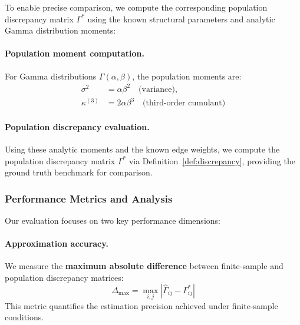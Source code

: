 \documentclass[11pt,a4paper]{article}
\numberwithin{equation}{section}
\begin{document}
To enable precise comparison, we compute the corresponding population discrepancy matrix $\Gamma^*$ using the known structural parameters and analytic Gamma distribution moments:

\paragraph{Population moment computation.} For Gamma distributions $\Gamma(\alpha, \beta)$, the population moments are:
\begin{align}
\sigma^2 &= \alpha \beta^2 \quad \text{(variance)}, \\
\kappa^{(3)} &= 2\alpha \beta^3 \quad \text{(third-order cumulant)}
\end{align}

\paragraph{Population discrepancy evaluation.} Using these analytic moments and the known edge weights, we compute the population discrepancy matrix $\Gamma^*$ via Definition~\ref{def:discrepancy}, providing the ground truth benchmark for comparison.

\subsubsection{Performance Metrics and Analysis}

Our evaluation focuses on two key performance dimensions:

\paragraph{Approximation accuracy.} We measure the \textbf{maximum absolute difference} between finite-sample and population discrepancy matrices:
\begin{equation}
\Delta_{\max} = \max_{i,j} |\hat{\Gamma}_{ij} - \Gamma^*_{ij}|
\end{equation}
This metric quantifies the estimation precision achieved under finite-sample conditions.
\end{document}
